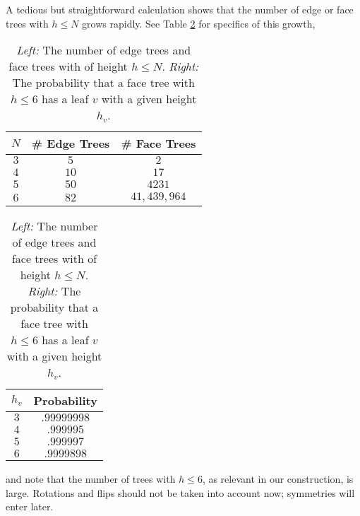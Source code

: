 \documentclass[aps,prl,twocolumn, superscriptaddress,groupedaddress,nofootinbib]{revtex4-1}
\begin{document}
A tedious but straightforward calculation shows that the number of
edge or face trees with $h \leq N$ grows rapidly. See 
Table \ref{tab:numedgefacetreeandprob} for specifics of this growth,
\begin{table}
\begin{tabular}{|c|c|c|}
\hline
$N$ & \# Edge Trees & \# Face Trees \\ \hline
$3$ & $5$ & $2$\\
$4$ & $10$ & $17$\\
$5$ & $50$ & $4231$ \\
$6$ & $82$ & $41,439,964$\\ \hline
\end{tabular} \hspace{1cm}
\begin{tabular}{|c|c|}
\hline
$h_v$ & Probability \\ \hline
$3$ & $.99999998$ \\
$4$ & $.999995$ \\
$5$ & $.999997$  \\
$6$ & $.9999898$ \\ \hline
\end{tabular}
\caption{\emph{Left:} The number of edge trees and face trees with of height $h\leq N$.
\emph{Right:} The probability that a face tree with $h\leq 6$ has a leaf $v$ with
a given height $h_v$.}
\label{tab:numedgefacetreeandprob}
\end{table}
and note that the number of trees with $h \leq 6$, as relevant in our
construction, is large. Rotations and flips should not be taken
into account now; symmetries will enter later.
\end{document}
